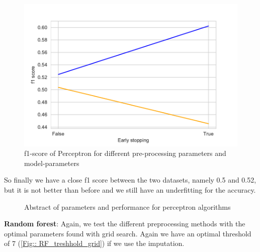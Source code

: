 \documentclass[11pt]{article}
\begin{document}
\begin{figure}[h]
\begin{minipage}[l]{0.33\textwidth}
\end{minipage}
\begin{minipage}[l]{0.33\textwidth}
\includegraphics[width=1.1\linewidth]{bridges/early_stopping_ppn.pdf}
\end{minipage}
\caption{f1-score of Perceptron for different pre-processing parameters and model-parameters}
\label{Fig:: PPN_result_manual parameter_tuning}
\end{figure}

So finally we have a close f1 score between the two datasets, namely 0.5 and 0.52, but it is not better than before and we still have an underfitting for the accuracy.

\begin{figure}[h]
\centering
{}
    \caption{Abstract of parameters and performance for perceptron algorithms}
    \label{tab_bridges0}
  \end{figure}

\textbf{Random forest}: Again, we test the different preprocessing methods with the optimal parameters found with grid search. Again we have an optimal threshold of 7 (\ref{Fig:: RF_treshhold_grid}) if we use the imputation.
\end{document}
